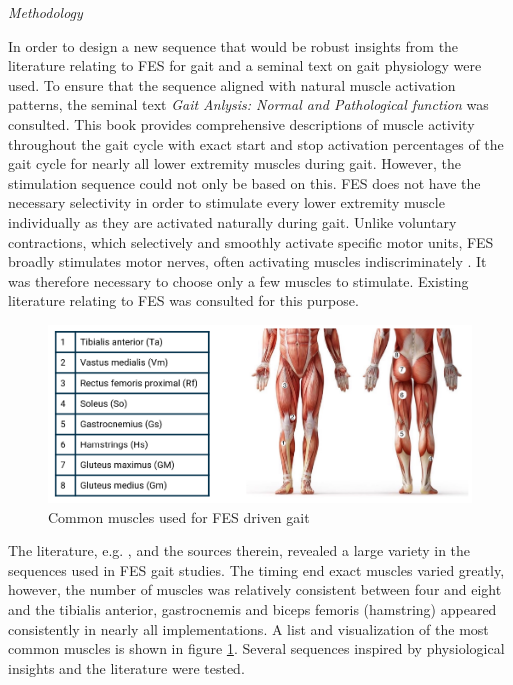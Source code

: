 \textit{Methodology}

In order to design a new sequence that would be robust insights from the literature relating to FES for gait and a seminal text on gait physiology were used. To ensure that the sequence aligned with natural muscle activation patterns, the seminal text \textit{Gait Anlysis: Normal and Pathological function} \cite{perry_gait_2024} was consulted. This book provides comprehensive descriptions of muscle activity throughout the gait cycle with exact start and stop activation percentages of the gait cycle for nearly all lower extremity muscles during gait. However, the stimulation sequence could not only be based on this. FES does not have the necessary selectivity in order to stimulate every lower extremity muscle individually as they are activated naturally during gait. Unlike voluntary contractions, which selectively and smoothly activate specific motor units, FES broadly stimulates motor nerves, often activating muscles indiscriminately . It was therefore necessary to choose only a few muscles to stimulate. Existing literature relating to FES was consulted for this purpose.

\begin{figure} [h]
    \centering
    \includegraphics[width=0.85\linewidth]{images/common_muscles.png}
    \caption{Common muscles used for FES driven gait}
    \label{fig:commonMuscles}
\end{figure}

The literature, e.g. \cite{aout_effects_2023}, \cite{chaikho_transcutaneous_2022} and the sources therein, revealed a large variety in the sequences used in FES gait studies. The timing end exact muscles varied greatly, however, the number of muscles was relatively consistent between four and eight and the tibialis anterior, gastrocnemis and biceps femoris (hamstring) appeared consistently in nearly all implementations. A list and visualization of the most common muscles is shown in figure \ref{fig:commonMuscles}. Several sequences inspired by physiological insights and the literature were tested. 
\newline \newline


